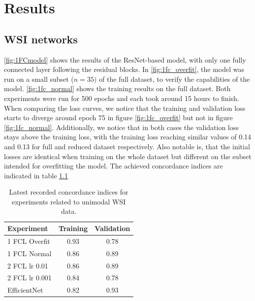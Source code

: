 
\chapter{Results}
  \label{Results}

\section{WSI networks}

\ref{fig:1FCmodel} shows the results of the ResNet-based model, with only one fully connected layer following the residual blocks. In \ref{fig:1fc_overfit}, the model was run on a small subset ($n=35)$ of the full dataset, to verify the capabilities of the model. \ref{fig:1fc_normal} shows the training results on the full dataset. Both experiments were run for 500 epochs and each took around 15 hours to finish.  
When comparing the loss curves, we notice that the training and validation loss starts to diverge around epoch 75 in figure \ref{fig:1fc_overfit} but not in figure \ref{fig:1fc_normal}. Additionally, we notice that in both cases the validation loss stays above the training loss, with the training loss reaching similar values of 0.14 and 0.13 for full and reduced dataset respectively. Also notable is, that the initial losses are identical when training on the whole dataset but different on the subset intended for overfitting the model.
The achieved concordance indices are indicated in table \ref{tab:c_indices}

\begin{table}[hb!]
    \centering
    \caption{Latest recorded concordance indices for experiments related to unimodal WSI data.}
    \begin{tabular}{l | c c}
       Experiment & Training & Validation  \\ [0.5ex] 
       \hline  
        1 FCL Overfit & 0.93 & 0.78 \\ 
        1 FCL Normal & 0.86 & 0.89 \\
        2 FCL lr 0.01 & 0.86 & 0.89 \\
        2 FCL lr 0.001 & 0.84 & 0.78 \\
        EfficientNet & 0.82 & 0.93 \\
        \hline
    \end{tabular}
    \label{tab:c_indices}
\end{table}


